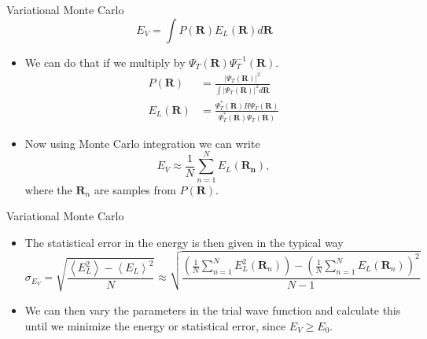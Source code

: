 \documentclass{beamer}
\newcommand{\R}{\mathbf{R}}
\begin{document}
\begin{frame}{Variational Monte Carlo}
   \begin{equation*}
      E_V = \int P(\R)E_L(\R) d\R
   \end{equation*}
\begin{itemize}
   \item We can do that if we multiply by $\Psi_T(\R)\Psi_T^{-1}(\R)$.
   \begin{align*}
      P(\R) &= \frac{|\Psi_T(\R)|^2}{\int|\Psi_T(\R)|^2d\R} \\
      E_L(\R) &= \frac{\Psi_T^*(\R) H \Psi_T(\R)}{\Psi_T^*(\R) \Psi_T(\R)}
   \end{align*}
   \item Now using Monte Carlo integration we can write
   \begin{equation*}
      E_V \approx \frac{1}{N} \sum\limits_{n=1}^N E_L(\mathbf{R_n}),
   \end{equation*}
   where the $\R_n$ are samples from $P(\R)$.
\end{itemize}
\end{frame}

\begin{frame}{Variational Monte Carlo}
\begin{itemize}
   \item The statistical error in the energy is then given in the typical way
   \begin{equation*}
      \sigma_{E_V} = \sqrt{\frac{\left<E_L^2\right>-\left<E_L\right>^2}{N}} \approx \sqrt{\frac{\left(\frac{1}{N}\sum\limits_{n=1}^NE_L^2(\R_n)\right) - \left(\frac{1}{N}\sum\limits_{n=1}^NE_L(\R_n)\right)^2}{N-1}}
   \end{equation*}
   \item We can then vary the parameters in the trial wave function and calculate this until we minimize the energy or statistical error, since $E_V \ge E_0$.
\end{itemize}
\end{frame}
\end{document}

